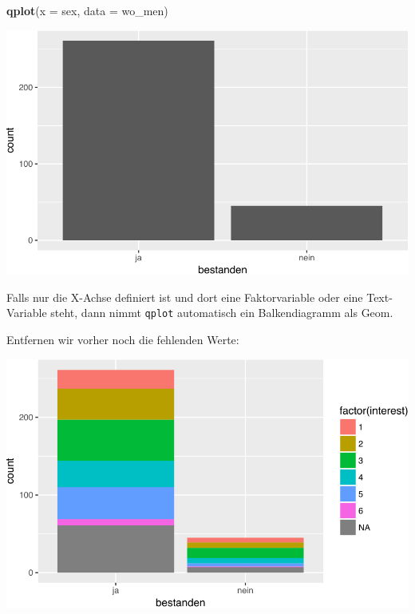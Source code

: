 \documentclass[12pt,ngerman,]{book}
\newenvironment{Shaded}{\begin{snugshade}}{\end{snugshade}}
\newcommand{\KeywordTok}[1]{\textcolor[rgb]{0.13,0.29,0.53}{\textbf{{#1}}}}
\newcommand{\DataTypeTok}[1]{\textcolor[rgb]{0.13,0.29,0.53}{{#1}}}
\newcommand{\StringTok}[1]{\textcolor[rgb]{0.31,0.60,0.02}{{#1}}}
\newcommand{\NormalTok}[1]{{#1}}
\renewenvironment{Shaded}{\begin{kframe}}{\end{kframe}}
\begin{document}
\begin{Shaded}
\begin{Highlighting}[]
\KeywordTok{qplot}\NormalTok{(}\DataTypeTok{x =} \NormalTok{sex, }\DataTypeTok{data =} \NormalTok{wo_men)}
\end{Highlighting}
\end{Shaded}

\begin{center}\includegraphics[width=0.7\linewidth]{050_Daten_visualisieren_files/figure-latex/unnamed-chunk-18-1} \end{center}

Falls nur die X-Achse definiert ist und dort eine Faktorvariable oder
eine Text-Variable steht, dann nimmt \texttt{qplot} automatisch ein
Balkendiagramm als Geom.

Entfernen wir vorher noch die fehlenden Werte:

\begin{Shaded}
\end{Shaded}

\begin{center}\includegraphics[width=0.7\linewidth]{050_Daten_visualisieren_files/figure-latex/unnamed-chunk-19-1} \end{center}
\end{document}
